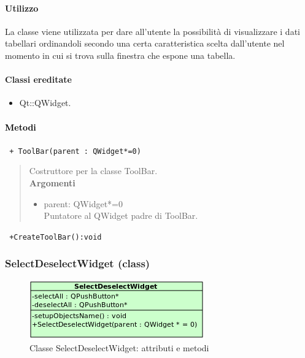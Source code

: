 \paragraph{Utilizzo\\}
La classe viene utilizzata per dare all'utente la possibilità di visualizzare i dati tabellari ordinandoli secondo una certa caratteristica scelta dall'utente nel momento in cui si trova sulla finestra che espone una tabella.
\paragraph{Classi ereditate\\}
\begin{itemize}
\item Qt::QWidget.
\end{itemize}
\paragraph{\textcolor{black}{Metodi\\}}
\color{blue}\verb! + ToolBar(parent : QWidget*=0)!
\begin{quote}
\color{black}Costruttore per la classe ToolBar. \\
\textbf{Argomenti}
\begin{itemize}
\item parent: QWidget*=0  \\ Puntatore al QWidget padre di ToolBar.
\end{itemize}
\end{quote}
\color{blue}\verb! +CreateToolBar():void!
\color{black}
\begin{quote}

\end{quote} 
\color{black}
\pagebreak
\subsubsection{SelectDeselectWidget (class)}
\label{speselDes}
\begin{figure}[!h]
\centering
			\includegraphics[width=0.6\linewidth]{./Content/Immagini/view/SelectDeselectWidget.png}
			\caption{Classe SelectDeselectWidget: attributi e metodi}
			\label{cl_seldesel}
\end{figure}
